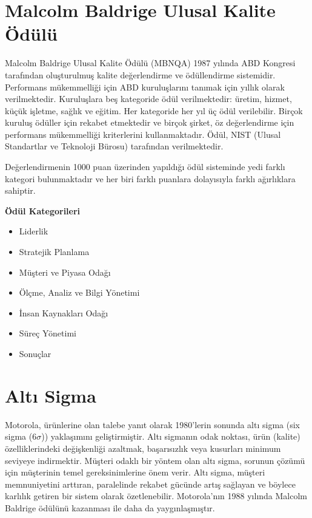 \documentclass[
]{book}
\providecommand{\tightlist}{%
  \setlength{\itemsep}{0pt}\setlength{\parskip}{0pt}}
\begin{document}
\hypertarget{malcolm-baldrige-ulusal-kalite-uxf6duxfcluxfc}{%
\section{Malcolm Baldrige Ulusal Kalite Ödülü}\label{malcolm-baldrige-ulusal-kalite-uxf6duxfcluxfc}}

Malcolm Baldrige Ulusal Kalite Ödülü (MBNQA) 1987 yılında ABD Kongresi tarafından oluşturulmuş kalite değerlendirme ve ödüllendirme sistemidir. Performans mükemmelliği için ABD kuruluşlarını tanımak için yıllık olarak verilmektedir. Kuruluşlara beş kategoride ödül verilmektedir: üretim, hizmet, küçük işletme, sağlık ve eğitim. Her kategoride her yıl üç ödül verilebilir. Birçok kuruluş ödüller için rekabet etmektedir ve birçok şirket, öz değerlendirme için performans mükemmelliği kriterlerini kullanmaktadır. Ödül, NIST (Ulusal Standartlar ve Teknoloji Bürosu) tarafından verilmektedir.

Değerlendirmenin 1000 puan üzerinden yapıldığı ödül sisteminde yedi farklı kategori bulunmaktadır ve her biri farklı puanlara dolayısıyla farklı ağırlıklara sahiptir.

\textbf{Ödül Kategorileri}

\begin{itemize}
\tightlist
\item
  Liderlik
\item
  Stratejik Planlama
\item
  Müşteri ve Piyasa Odağı
\item
  Ölçme, Analiz ve Bilgi Yönetimi
\item
  İnsan Kaynakları Odağı
\item
  Süreç Yönetimi
\item
  Sonuçlar
\end{itemize}

\hypertarget{altux131-sigma}{%
\section{Altı Sigma}\label{altux131-sigma}}

Motorola, ürünlerine olan talebe yanıt olarak 1980'lerin sonunda altı sigma (six sigma (6\(\sigma\))) yaklaşımını geliştirmiştir. Altı sigmanın odak noktası, ürün (kalite) özelliklerindeki değişkenliği azaltmak, başarısızlık veya kusurları minimum seviyeye indirmektir. Müşteri odaklı bir yöntem olan altı sigma, sorunun çözümü için müşterinin temel gereksinimlerine önem verir. Altı sigma, müşteri memnuniyetini arttıran, paralelinde rekabet gücünde artış sağlayan ve böylece karlılık getiren bir sistem olarak özetlenebilir. Motorola'nın 1988 yılında Malcolm Baldrige ödülünü kazanması ile daha da yaygınlaşmıştır.
\end{document}
